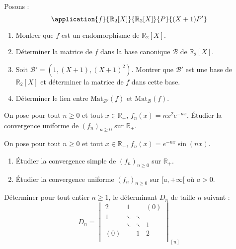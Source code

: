 \documentclass[twoside,a4paper,french,10pt]{VcCours}
\begin{document}
\begin{Exercice}
    Posons :
    $$ \application{f}{\mathbb{R}_2[X]}{\mathbb{R}_2[X]}{P}{(X+1)P'}$$

    \begin{enumerate}
        \item Montrer que $f$ est un endomorphisme de $ \mathbb{R}_2[X]$.
        \item Déterminer la matrice de $f$ dans la base canonique $\mathcal{B}$ de $\mathbb{R}_2[X]$.
        \item Soit $\mathcal{B}'= (1, (X+1),(X+1)^2)$. Montrer que $\mathcal{B}'$ est une base de $\mathbb{R}_2[X]$ et déterminer la matrice de $f$ dans cette base.
        \item Déterminer le lien entre $\textrm{Mat}_{\mathcal{B}'}(f)$ et $\textrm{Mat}_{\mathcal{B}}(f)$.
    \end{enumerate}
\end{Exercice} 



\begin{Exercice}
    On pose pour tout $n \geq 0$ et tout $x \in \mathbb{R}_+$, $f_n(x)= nx^2 e^{-nx}$. Étudier la convergence uniforme de $(f_n)_{n \geq 0}$ sur $\mathbb{R}_+$. 
\end{Exercice} 

\begin{Exercice}
    On pose pour tout $n \geq 0$ et tout $x \in \mathbb{R}_+$, $f_n(x)= e^{-nx} \sin(nx)$.
    \begin{enumerate}
        \item Étudier la convergence simple de $(f_n)_{n \geq 0}$ sur $\mathbb{R}_+$. 
        \item Étudier la convergence uniforme $(f_n)_{n \geq 0}$ sur $[a, + \infty[$ où $a>0$. 
    \end{enumerate}
\end{Exercice} 

\begin{Exercice}
    Déterminer pour tout entier $n \geq 1$, le déterminant $D_n$ de taille $n$ suivant :
    \[
        D_n =
        \begin{vmatrix}
            2 & 1 & {} & {(0)} \\
            1 & \ddots & \ddots & {} \\
            {} & \ddots & \ddots & 1 \\
            {(0)} & {} & 1 & 2 \\
        \end{vmatrix}_{[n]}
    \]
\end{Exercice} 
\end{document}
